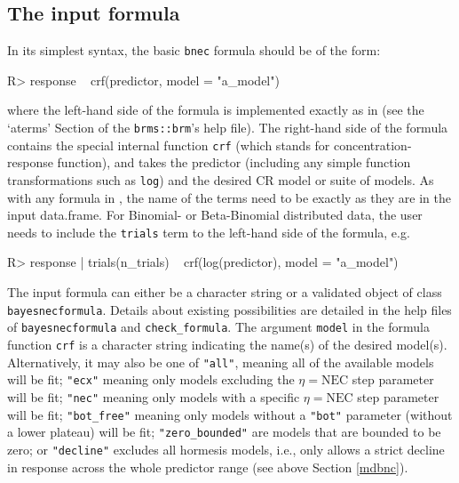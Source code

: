 \documentclass[
  shortnames]{jss}
\begin{document}
\newpage

\hypertarget{the-input-formula}{%
\subsection{The input formula}\label{the-input-formula}}

In its simplest syntax, the basic \texttt{bnec} formula should be of the form:

\begin{CodeChunk}
\begin{CodeInput}
R> response ~ crf(predictor, model = "a_model")
\end{CodeInput}
\end{CodeChunk}

where the left-hand side of the formula is implemented exactly as in  (see the `aterms' Section of the \texttt{brms::brm}'s help file). The right-hand side of the formula contains the special internal function \texttt{crf} (which stands for concentration-response function), and takes the predictor (including any simple function transformations such as \texttt{log}) and the desired CR model or suite of models. As with any formula in , the name of the terms need to be exactly as they are in the input data.frame. For Binomial- or Beta-Binomial distributed data, the user needs to include the \texttt{trials} term to the left-hand side of the formula, e.g.

\begin{CodeChunk}
\begin{CodeInput}
R> response | trials(n_trials) ~ crf(log(predictor), model = "a_model")
\end{CodeInput}
\end{CodeChunk}

The input formula can either be a character string or a validated object of class \texttt{bayesnecformula}. Details about existing possibilities are detailed in the help files of \texttt{bayesnecformula} and \texttt{check\_formula}. The argument \texttt{model} in the formula function \texttt{crf} is a character string indicating the name(s) of the desired model(s). Alternatively, it may also be one of \texttt{"all"}, meaning all of the available models will be fit; \texttt{"ecx"} meaning only models excluding the \(\eta = \text{NEC}\) step parameter will be fit; \texttt{"nec"} meaning only models with a specific \(\eta = \text{NEC}\) step parameter will be fit; \texttt{"bot\_free"} meaning only models without a \texttt{"bot"} parameter (without a lower plateau) will be fit; \texttt{"zero\_bounded"} are models that are bounded to be zero; or \texttt{"decline"} excludes all hormesis models, i.e., only allows a strict decline in response across the whole predictor range (see above Section \ref{mdbnc}).
\end{document}
